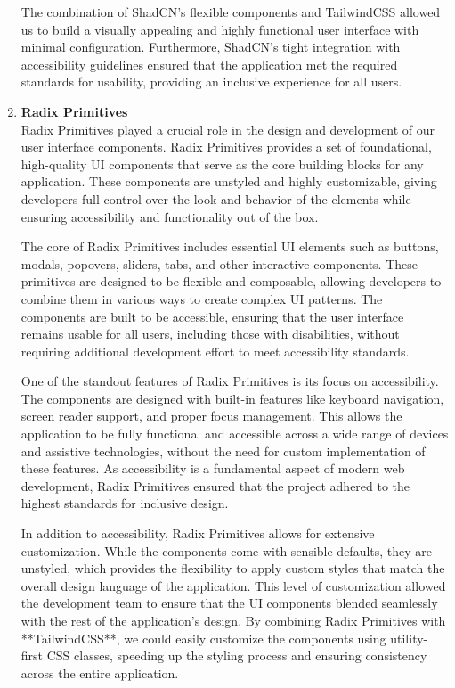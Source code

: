 \begin{enumerate}
    The combination of ShadCN’s flexible components and TailwindCSS allowed us to build a visually appealing and highly functional user interface with minimal configuration. Furthermore, ShadCN's tight integration with accessibility guidelines ensured that the application met the required standards for usability, providing an inclusive experience for all users.

    \item \textbf{Radix Primitives} \\
    Radix Primitives played a crucial role in the design and development of our user interface components. Radix Primitives provides a set of foundational, high-quality UI components that serve as the core building blocks for any application. These components are unstyled and highly customizable, giving developers full control over the look and behavior of the elements while ensuring accessibility and functionality out of the box.

    The core of Radix Primitives includes essential UI elements such as buttons, modals, popovers, sliders, tabs, and other interactive components. These primitives are designed to be flexible and composable, allowing developers to combine them in various ways to create complex UI patterns. The components are built to be accessible, ensuring that the user interface remains usable for all users, including those with disabilities, without requiring additional development effort to meet accessibility standards.

    One of the standout features of Radix Primitives is its focus on accessibility. The components are designed with built-in features like keyboard navigation, screen reader support, and proper focus management. This allows the application to be fully functional and accessible across a wide range of devices and assistive technologies, without the need for custom implementation of these features. As accessibility is a fundamental aspect of modern web development, Radix Primitives ensured that the project adhered to the highest standards for inclusive design.

    In addition to accessibility, Radix Primitives allows for extensive customization. While the components come with sensible defaults, they are unstyled, which provides the flexibility to apply custom styles that match the overall design language of the application. This level of customization allowed the development team to ensure that the UI components blended seamlessly with the rest of the application’s design. By combining Radix Primitives with **TailwindCSS**, we could easily customize the components using utility-first CSS classes, speeding up the styling process and ensuring consistency across the entire application.


\end{enumerate}
